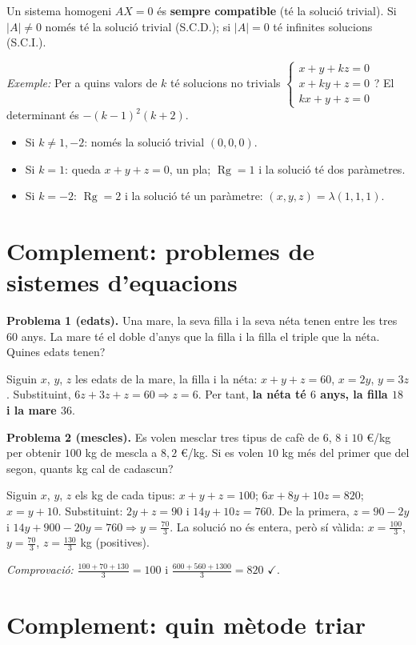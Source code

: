 Un sistema homogeni $AX=0$ és \textbf{sempre compatible} (té la solució trivial). Si $|A|\neq0$ només té la solució trivial (S.C.D.); si $|A|=0$ té infinites solucions (S.C.I.).

\emph{Exemple:} Per a quins valors de $k$ té solucions no trivials $\begin{cases}x+y+kz=0\\x+ky+z=0\\kx+y+z=0\end{cases}$? El determinant és $-(k-1)^{2}(k+2)$.

\begin{itemize}
\item Si $k\neq1,-2$: només la solució trivial $(0,0,0)$.
\item Si $k=1$: queda $x+y+z=0$, un pla; $\operatorname{Rg}=1$ i la solució té dos paràmetres.
\item Si $k=-2$: $\operatorname{Rg}=2$ i la solució té un paràmetre: $(x,y,z)=\lambda(1,1,1)$.
\end{itemize}

\section{Complement: problemes de sistemes d'equacions}

\textbf{Problema 1 (edats).} Una mare, la seva filla i la seva néta tenen entre les tres $60$ anys. La mare té el doble d'anys que la filla i la filla el triple que la néta. Quines edats tenen?

Siguin $x$, $y$, $z$ les edats de la mare, la filla i la néta: $x+y+z=60$, $x=2y$, $y=3z$. Substituint, $6z+3z+z=60\Rightarrow z=6$. Per tant, \textbf{la néta té $6$ anys, la filla $18$ i la mare $36$}.

\textbf{Problema 2 (mescles).} Es volen mesclar tres tipus de cafè de $6$, $8$ i $10$ \euro{}/kg per obtenir $100$ kg de mescla a $8{,}2$ \euro{}/kg. Si es volen $10$ kg més del primer que del segon, quants kg cal de cadascun?

Siguin $x$, $y$, $z$ els kg de cada tipus: $x+y+z=100$; $6x+8y+10z=820$; $x=y+10$. Substituint: $2y+z=90$ i $14y+10z=760$. De la primera, $z=90-2y$ i $14y+900-20y=760\Rightarrow y=\tfrac{70}{3}$. La solució no és entera, però sí vàlida: $x=\tfrac{100}{3}$, $y=\tfrac{70}{3}$, $z=\tfrac{130}{3}$ kg (positives).

\emph{Comprovació:} $\tfrac{100+70+130}{3}=100$ i $\tfrac{600+560+1300}{3}=820$ $\checkmark$.

\section{Complement: quin mètode triar}

